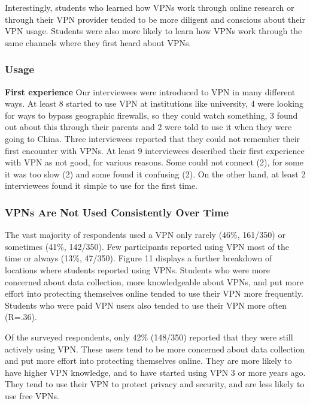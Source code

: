 Interestingly, students who learned how VPNs work through online research or
through their VPN provider tended to be more diligent and conscious about
their VPN usage. Students were also more likely to learn how VPNs work through
the same channels where they first heard about VPNs. 







\subsubsection{Usage} \textbf{First experience} Our interviewees were
introduced to VPN in many different ways. At least 8 started to use VPN at
institutions like university, 4 were looking for ways to bypass geographic
firewalls, so they could watch something, 3 found out about this through their
parents and 2 were told to use it when they were going to China. Three
interviewees reported that they could not remember their first encounter with
VPNs.  At least 9 interviewees described their first experience with VPN as
not good, for various reasons. Some could not connect (2), for some it was too
slow (2) and some found it confusing (2).  On the other hand, at least 2
interviewees found it simple to use for the first time. 


\subsubsection{VPNs Are Not Used Consistently Over Time}

The vast majority of respondents used a VPN only rarely (46\%, 161/350) or
sometimes (41\%, 142/350). Few participants reported using VPN most of the
time or always (13\%, 47/350). Figure 11 displays a further breakdown of
locations where students reported using VPNs. Students who were more concerned
about data collection, more knowledgeable about VPNs, and put more effort into
protecting themselves online tended to use their VPN more frequently. Students
who were paid VPN users also tended to use their VPN more often (R=.36).



Of the surveyed respondents, only 42\% (148/350) reported that they were still
actively using VPN. These users tend to be more concerned about data
collection and put more effort into protecting themselves online. They are
more likely to have higher VPN knowledge, and to have started using VPN 3 or
more years ago. They tend to use their VPN to protect privacy and security,
and are less likely to use free VPNs.

